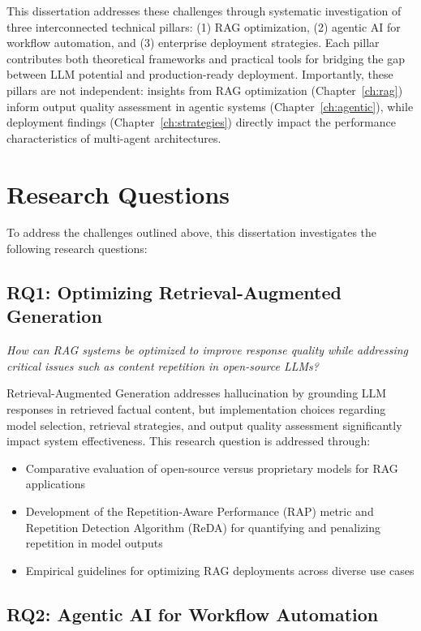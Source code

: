 This dissertation addresses these challenges through systematic investigation of three interconnected technical pillars: (1) RAG optimization, (2) agentic AI for workflow automation, and (3) enterprise deployment strategies. Each pillar contributes both theoretical frameworks and practical tools for bridging the gap between LLM potential and production-ready deployment. Importantly, these pillars are not independent: insights from RAG optimization (Chapter~\ref{ch:rag}) inform output quality assessment in agentic systems (Chapter~\ref{ch:agentic}), while deployment findings (Chapter~\ref{ch:strategies}) directly impact the performance characteristics of multi-agent architectures.

\section{Research Questions}
\label{sec:research_questions}

To address the challenges outlined above, this dissertation investigates the following research questions:

\subsection{RQ1: Optimizing Retrieval-Augmented Generation}

\textit{How can RAG systems be optimized to improve response quality while addressing critical issues such as content repetition in open-source LLMs?}

Retrieval-Augmented Generation addresses hallucination by grounding LLM responses in retrieved factual content, but implementation choices regarding model selection, retrieval strategies, and output quality assessment significantly impact system effectiveness. This research question is addressed through:

\begin{itemize}[leftmargin=*]
    \item Comparative evaluation of open-source versus proprietary models for RAG applications
    \item Development of the Repetition-Aware Performance (RAP) metric and Repetition Detection Algorithm (ReDA) for quantifying and penalizing repetition in model outputs
    \item Empirical guidelines for optimizing RAG deployments across diverse use cases
\end{itemize}

\subsection{RQ2: Agentic AI for Workflow Automation}

